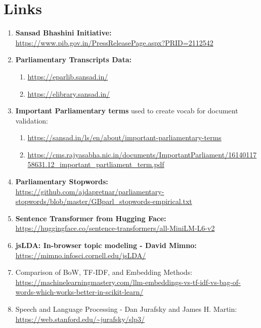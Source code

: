 \documentclass{report}
\begin{document}
\renewcommand{\bibname}{References}
\printbibliography
{}

\appendix
\chapter{Links}
\begin{enumerate}
    \item \textbf{Sansad Bhashini Initiative:}\label{appendix:sansad-bhashini}\\ \url{https://www.pib.gov.in/PressReleasePage.aspx?PRID=2112542}
    \item \textbf{Parliamentary Transcripts Data:}\label{appendix:parliament-transcripts} 
        \begin{enumerate}
            \item \url{https://eparlib.sansad.in/}
            \item \url{https://elibrary.sansad.in/}
        \end{enumerate}
    \item \textbf{Important Parliamentary terms}\label{appendix:parliamentary-terms} used to create vocab for document validation:
        \begin{enumerate}
            \item \url{https://sansad.in/ls/en/about/important-parliamentary-terms}
            \item \url{https://cms.rajyasabha.nic.in/documents/ImportantParliament/1614011758631.12_important_partliament_term.pdf}
        \end{enumerate}
    \item \textbf{Parliamentary Stopwords:}\label{appendix:parliamentary-stopwords} \url{https://github.com/ajdapretnar/parliamentary-stopwords/blob/master/GBparl_stopwords-empirical.txt}
    \item \textbf{Sentence Transformer from Hugging Face:}\label{appendix:sentence-transformer}\\ \url{https://huggingface.co/sentence-transformers/all-MiniLM-L6-v2}
    \item \textbf{jsLDA: In-browser topic modeling - David Mimno:}\label{appendix:topic-modeling} \url{https://mimno.infosci.cornell.edu/jsLDA/}
    \item Comparison of BoW, TF-IDF, and Embedding Methods\label{appendix:comparison}: \url{https://machinelearningmastery.com/llm-embeddings-vs-tf-idf-vs-bag-of-words-which-works-better-in-scikit-learn/}
    \item Speech and Language Processing - Dan Jurafsky and James H. Martin:\label{appendix:jurafsky} \url{https://web.stanford.edu/~jurafsky/slp3/}

\end{enumerate}
\end{document}
